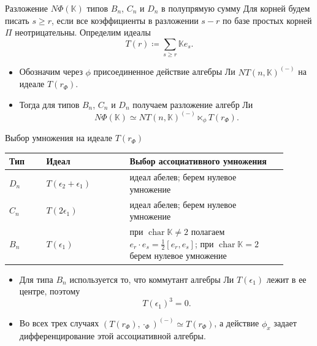 \documentclass[12pt,aspectratio=169]{beamer}
\DeclareMathOperator{\Char}{char}
\newcommand{\K}{\mathbb{K}}
\begin{document}
\begin{frame}[t]{Разложение $N\Phi(\K)$ типов $B_n$, $C_n$ и $D_n$ в полупрямую сумму}
    \small
    Для корней будем писать $s\ge r$, если все коэффициенты в разложении $s-r$ по базе простых корней $\Pi$ неотрицательны. Определим идеалы
    \[
        T(r)\coloneq \sum_{s\ge r}\K e_s.
    \]

    \begin{itemize}
        \item Обозначим через $\phi$ присоединенное действие алгебры Ли $NT(n,\K)^{(-)}$ на
              идеале $T(r_\Phi)$.
        \item Тогда для типов $B_n$, $C_n$ и $D_n$ получаем разложение алгебр Ли
              \[
                  N\Phi(\K)\simeq NT(n,\K)^{(-)}\ltimes_\phi T(r_\Phi).
              \]
    \end{itemize}
\end{frame}

\begin{frame}[t]{Выбор умножения на идеале $T(r_\Phi)$}
    \small
    \begin{center}
        \begin{tabular}{>{\raggedright\arraybackslash}p{0.12\linewidth} >{\raggedright\arraybackslash}p{0.27\linewidth} >{\raggedright\arraybackslash}p{0.51\linewidth}}
            \toprule
            Тип   & Идеал                        & Выбор ассоциативного умножения                  \\
            \midrule
            $D_n$ & $T(\epsilon_2 + \epsilon_1)$ & идеал абелев; берем нулевое умножение           \\
            $C_n$ & $T(2\epsilon_1)$             & идеал абелев; берем нулевое умножение           \\
            $B_n$ & $T(\epsilon_1)$              & при $\Char\K\neq 2$ полагаем
            $\displaystyle e_r\cdot e_s=\frac12[e_r,e_s]$; при $\Char\K=2$ берем нулевое умножение \\
            \bottomrule
        \end{tabular}
    \end{center}

    \begin{itemize}
        \item Для типа $B_n$ используется то, что коммутант алгебры Ли $T(\epsilon_1)$ лежит
              в ее центре, поэтому
              \[
                  T(\epsilon_1)^3=0.
              \]
        \item Во всех трех случаях $(T(r_\Phi),\cdot_\Phi)^{(-)}\simeq T(r_\Phi)$, а действие
              $\phi_x$ задает дифференцирование этой ассоциативной алгебры.
    \end{itemize}
\end{frame}
\end{document}
